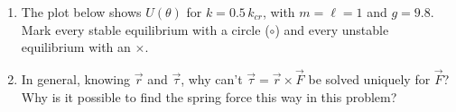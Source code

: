 \documentclass[11pt,letterpaper]{article}
\begin{document}
\vspace{1.7in}
\begin{enumerate}[resume*=quiz]

\item The plot below shows $U(\theta)$ for $k = 0.5\,k_{cr}$, with $m = \ell = 1$ and $g = 9.8$. Mark every stable equilibrium with a circle ($\circ$) and every unstable equilibrium with an $\times$.

\begin{center}
\end{center}

\item In general, knowing $\vec{r}$ and $\vec{\tau}$, why can't $\vec{\tau} = \vec{r} \times \vec{F}$ be solved uniquely for $\vec{F}$? Why is it possible to find the spring force this way in this problem?
\vspace*{\fill}

\end{enumerate}
\end{document}
